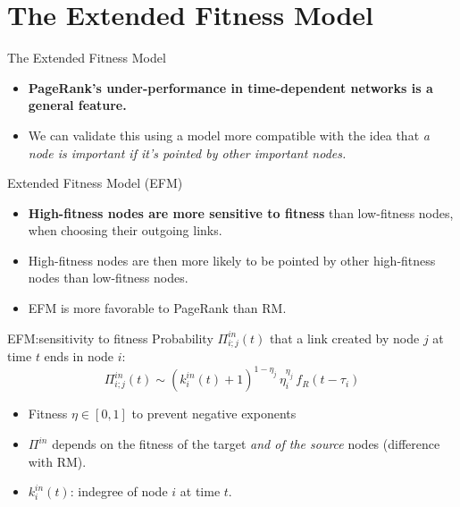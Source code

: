 \section{The Extended Fitness Model}

\begin{frame}{The Extended Fitness Model}
    \begin{itemize}
        \item \textbf{PageRank's under-performance in time-dependent networks is a general feature.}
        \item We can validate this using a model more compatible with the idea that \emph{a node is important if it's pointed by other important nodes.}
    \end{itemize}
    \begin{center}
        \alert{Extended Fitness Model} (EFM)
    \end{center}
    \begin{itemize}
        \item \textbf{High-fitness nodes are more sensitive to fitness} than low-fitness nodes, when choosing their outgoing links.
        \item High-fitness nodes are then more likely to be pointed by other high-fitness nodes than low-fitness nodes.
        \item EFM is \alert{more favorable} to PageRank than RM.
    \end{itemize}
\end{frame}

\begin{frame}{EFM:\@ sensitivity to fitness}
    Probability $\Pi_{i;j}^{in}(t)$ that a link created by node $j$ at time $t$ ends in node $i$:
    \[
        \Pi_{i;j}^{in}(t) \sim (k_i^{in}(t)+1)^{1-\eta_j} \, \eta_i^{\eta_j} \, f_R(t-\tau_i)
    \]
    \begin{itemize}
        \item Fitness $\eta \in [0, 1]$ to prevent negative exponents
        \item $\Pi^{in}$ depends on the fitness of the target \emph{and of the source} nodes (difference with RM).
        \item $k_i^{in}(t)$: indegree of node $i$ at time $t$.
    \end{itemize}
\end{frame}

